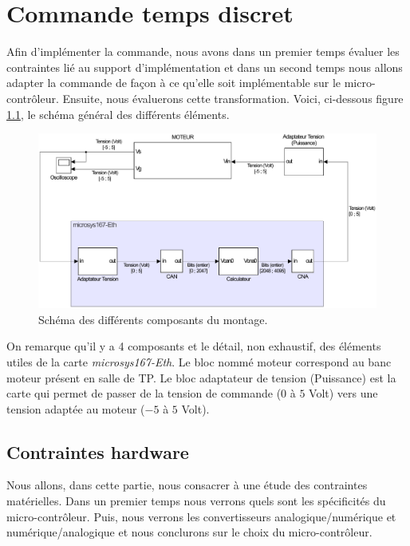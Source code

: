 \chapter{Commande temps discret}
Afin d'implémenter la commande, nous avons dans un premier temps évaluer les contraintes lié au support d'implémentation et dans un second temps nous allons adapter la commande de façon à ce qu'elle soit implémentable sur le micro-contrôleur. Ensuite, nous évaluerons cette transformation. Voici, ci-dessous figure \ref{fig:GeneralSCHEMA}, le schéma général des différents éléments.	
\begin{figure}[!ht]
\centering 
\includegraphics[width=.7\textwidth]{./V/images/schemaMO_MICRO.pdf}
\caption{\label{fig:GeneralSCHEMA}Schéma des différents composants du montage.}
\end{figure}
On remarque qu'il y a 4 composants et le détail, non exhaustif, des éléments utiles de la carte \emph{microsys167-Eth}.
Le bloc nommé moteur correspond au banc moteur présent en salle de TP. Le bloc adaptateur de tension (Puissance) est la carte qui permet de passer de la tension de commande ($0$ à $5$ Volt) vers une tension adaptée au moteur ($-5$ à $5$ Volt).
\section{Contraintes hardware} 
Nous allons, dans cette partie, nous consacrer à une étude des contraintes matérielles. Dans un premier temps nous verrons quels sont les spécificités du micro-contrôleur. Puis, nous verrons les convertisseurs analogique/numérique et numérique/analogique et nous conclurons sur le choix du micro-contrôleur. 
